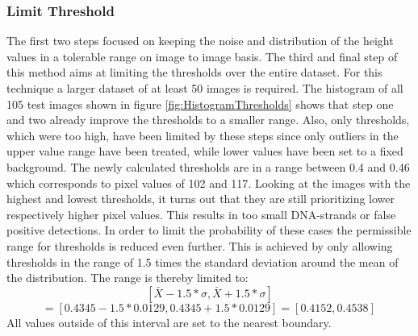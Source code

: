 \documentclass{article}
\begin{document}
\subsubsection{Limit Threshold}
The first two steps focused on keeping the noise and distribution of the height values in a tolerable range on image to image basis. The third and final step of this method aims at limiting the thresholds over the entire dataset.
For this technique a larger dataset of at least 50 images is required.
The histogram of all 105 test images shown in figure \ref{fig:HistogramThresholds} shows that step one and two already improve the thresholds to a smaller range.
Also, only thresholds, which were too high, have been limited by these steps since only outliers in the upper value range have been treated, while lower values have been set to a fixed background.
The newly calculated thresholds are in a range between 0.4 and 0.46 which corresponds to pixel values of 102 and 117.
Looking at the images with the highest and lowest thresholds, it turns out that they are still prioritizing lower respectively higher pixel values. This results in too small DNA-strands or false positive detections.
In order to limit the probability of these cases the permissible range for thresholds is reduced even further. This is achieved by only allowing thresholds in the range of 1.5 times the standard deviation around the mean of the distribution.
The range is thereby limited to: 
\[
[\bar X - 1.5 * \sigma, \bar X + 1.5 * \sigma] 
\]
\[
= [0.4345-1.5*0.0129, 0.4345+1.5*0.0129] 
= [0.4152,0.4538]\,  %
\]
All values outside of this interval are set to the nearest boundary.
\end{document}
